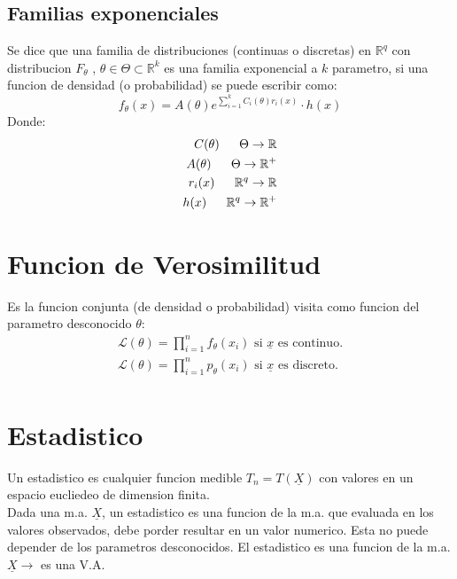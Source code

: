 \documentclass[titlepage,a4paper]{article}
\begin{document}
\subsection{Familias exponenciales}
Se dice que una familia de distribuciones (continuas o discretas) en $\mathbb{R}^{q}$ con distribucion $F_{\theta}$
, $\theta \in \Theta \subset \mathbb{R}^{k} $ es una familia exponencial a $k$ parametro, si una funcion de densidad (o probabilidad) 
se puede escribir como:
\begin{equation*}
    f_{\theta}(x) = A(\theta) e^{\sum_{i=1}^{k}C_{i}(\theta)r_{i}(x)} \cdot h(x)
\end{equation*}
Donde:
\begin{eqnarray*}
    C(\theta) \hspace{16px} \Theta \rightarrow \mathbb{R}\\
    A(\theta) \hspace{16px} \Theta \rightarrow \mathbb{R}^{+}\\
    r_{i}(x) \hspace{16px} \mathbb{R}^{q} \rightarrow \mathbb{R}\\
    h(x) \hspace{16px} \mathbb{R}^{q} \rightarrow \mathbb{R}^{+}\\
\end{eqnarray*}
\section{Funcion de Verosimilitud}
Es la funcion conjunta (de densidad o probabilidad) visita como funcion del parametro desconocido $\theta$:
\begin{eqnarray*}
    \mathcal{L}(\theta) = \prod_{i=1}^{n} f_{\theta} (x_{i}) \text{ si } \underline{x} \text{ es continuo.}\\
    \mathcal{L}(\theta) = \prod_{i=1}^{n} p_{\theta} (x_{i}) \text{ si } \underline{x} \text{ es discreto.}\\  
\end{eqnarray*}
\section{Estadistico}
Un estadistico es cualquier funcion medible $T_{n} = T(\underline{X})$ con valores en un espacio eucliedeo de dimension finita.\\
Dada una m.a. $\underline{X}$, un estadistico es una funcion de la m.a. que evaluada en los valores observados, debe porder resultar en un valor
numerico. Esta no puede depender de los parametros desconocidos. El estadistico es una funcion de la m.a. $\underline{X} \rightarrow$ es una V.A.
\end{document}
